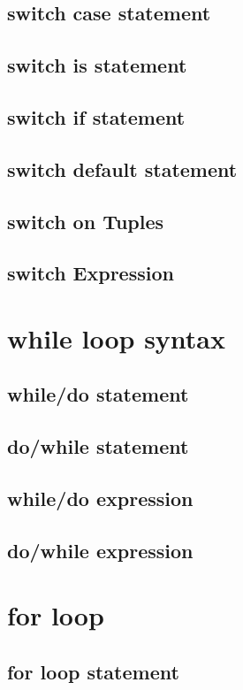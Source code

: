 \documentclass{tufte-book}
\begin{document}
            \subsection{switch case statement}
            \subsection{switch is statement}
            \subsection{switch if statement}
            \subsection{switch default statement}
            \subsection{switch on Tuples}
            \subsection{switch Expression}

            \section{while loop syntax}
            \subsection{while/do statement}
            \subsection{do/while statement}
            \subsection{while/do expression}
            \subsection{do/while expression}
            \section{for loop}
            \subsection{for loop statement}
\end{document}
